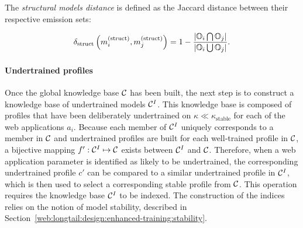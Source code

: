 \begin{definition}
  The \emph{structural models distance} is defined as the Jaccard distance between their respective emission sets:

\begin{equation}
  \delta_{\text{struct}}\left(m^{\left(\text{struct}\right)}_i,m^{\left(\text{struct}\right)}_j\right)=
  1-\frac{\left|\mathbb{O}_i\bigcap\mathbb{O}_j\right|}
  {\left|\mathbb{O}_i\bigcup\mathbb{O}_j\right|}.
\end{equation}
\end{definition}

\paragraph{Undertrained profiles}
Once the global knowledge base $\mathcal{C}$ has been built, the next step is to construct a knowledge base of undertrained models $\mathcal{C}^I$.  This knowledge base is composed of profiles that have been deliberately undertrained on $\kappa\ll\kappa_{\text{stable}}$ for each of the web applications $a_i$.  Because each member of $\mathcal{C}^I$ uniquely corresponds to a member in $\mathcal{C}$ and undertrained profiles are built for each well-trained profile in $\mathcal{C}$, a bijective mapping $f':\mathcal{C}^I\mapsto\mathcal{C}$ exists between $\mathcal{C}^I$ and $\mathcal{C}$.  Therefore, when a web application parameter is identified as likely to be undertrained, the corresponding undertrained profile $c'$ can be compared to a similar undertrained profile in $\mathcal{C}^I$, which is then used to select a corresponding stable profile from $\mathcal{C}$. This operation requires the knowledge base $\mathcal{C}^{I}$ to be indexed. The construction of the indices relies on the notion of model stability, described in Section~\ref{web:longtail:design:enhanced-training:stability}.

